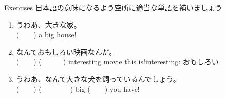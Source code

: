 \documentclass[aspectratio=169,xcolor={dvipsnames,table}]{beamer}
\begin{document}
\begin{frame}[plain]{Exercises}
日本語の意味になるよう空所に適当な単語を補いましょう
 \begin{enumerate}
  \item うわあ、大きな家。\\
	(~~~~) a big house!
  \item なんておもしろい映画なんだ。\\
	(~~~~) (~~~~~~) interesting movie this is!\hfill{\scriptsize interesting: おもしろい}
  \item うわあ、なんて大きな犬を飼っているんでしょう。\\
	(~~~~) (~~~~~~~~) big (~~~~) you have!
 \end{enumerate}
\end{frame}
\end{document}
